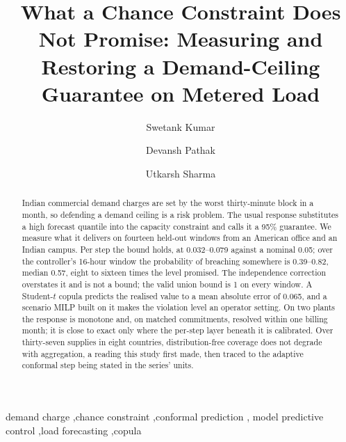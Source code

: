 \documentclass[preprint,11pt]{elsarticle}
\begin{document}
\begin{frontmatter}

\title{What a Chance Constraint Does Not Promise: Measuring and
Restoring a Demand-Ceiling Guarantee on Metered Load}

\author[a]{Swetank Kumar}
\author[a]{Devansh Pathak}
\author[a]{Utkarsh Sharma}

\begin{abstract}
Indian commercial demand charges are set by the worst thirty-minute block in a
month, so defending a demand ceiling is a risk problem. The usual response
substitutes a high forecast quantile into the capacity constraint and calls it a
95\% guarantee. We measure what it delivers on fourteen held-out windows from an
American office and an Indian campus. Per step the bound holds, at
0.032--0.079 against a nominal 0.05; over the controller's 16-hour window the
probability of breaching somewhere is 0.39--0.82, median 0.57, eight to sixteen
times the level promised. The independence correction overstates it and is not
a bound; the valid union bound is 1 on every window. A Student-$t$ copula
predicts the realised value to a mean absolute error of 0.065, and a scenario
MILP built on it makes the violation level an operator setting. On two plants
the response is monotone and, on matched commitments, resolved within one
billing month; it is close to exact only where the per-step layer beneath it is
calibrated. Over thirty-seven supplies in eight countries, distribution-free
coverage does not degrade with aggregation, a reading this study first made,
then traced to the adaptive conformal step being stated in the series' units.
\end{abstract}


\begin{keyword}
demand charge \sep chance constraint \sep conformal prediction \sep
model predictive control \sep load forecasting \sep copula
\end{keyword}

\end{frontmatter}
\end{document}
